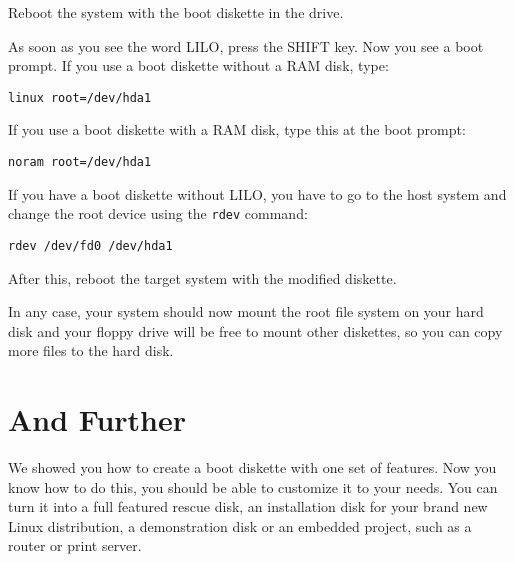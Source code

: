 \documentclass[12pt,a4paper]{article}
\begin{document}
Reboot the system with the boot diskette in the drive.

As soon as you see the word LILO, press the SHIFT key. Now you see a
boot prompt. If you use a boot diskette without a RAM disk, type:
\begin{verbatim}
linux root=/dev/hda1
\end{verbatim}

If you use a boot diskette with a RAM disk, type this at the boot prompt:
\begin{verbatim}
noram root=/dev/hda1
\end{verbatim}

If you have a boot diskette without LILO, you have to go to the host
system and change the root device using the {\tt rdev} command:
\begin{verbatim}
rdev /dev/fd0 /dev/hda1
\end{verbatim}
After this, reboot the target system with the modified diskette.

In any case, your system should now mount the root file system on your
hard disk and your floppy drive will be free to mount other diskettes,
so you can copy more files to the hard disk.

\section{And Further}

We showed you how to create a boot diskette with one set of
features. Now you know how to do this, you should be able to customize
it to your needs. You can turn it into a full featured rescue disk, an
installation disk for your brand new Linux distribution, a
demonstration disk or an embedded project, such as a router or print
server. 
\end{document}
